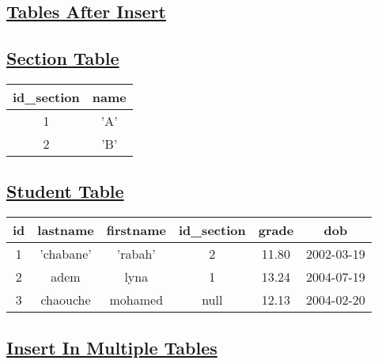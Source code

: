 

\subsection*{\underline{\textbf{Tables After Insert}}}

\subsection*{\underline{\textbf{Section Table}}}

\begin{center}

 \renewcommand{\arraystretch}{1.5}
    \begin{tabular}{|c|c|}
        \hline 
        id\_section & name \\
        \hline
        1 & 'A'\\
        \hline
        2 & 'B'\\
        \hline
    \end{tabular}
\end{center}


\subsection*{\underline{\textbf{Student Table}}}
\begin{center}

 \renewcommand{\arraystretch}{1.5}
    \begin{tabular}{|c|c|c|c|c|c|}
        \hline
        id & lastname & firstname & id\_section & grade & dob\\
        \hline
        1 & 'chabane' & 'rabah' & 2 & 11.80 & 2002-03-19 \\
        \hline
        2 & adem & lyna & 1 & 13.24 & 2004-07-19\\
        \hline
        3 & chaouche & mohamed & null & 12.13 & 2004-02-20 \\
        \hline
    \end{tabular}
\end{center}


\newpage


\subsection*{\textbf{\underline{Insert In Multiple Tables}}}




